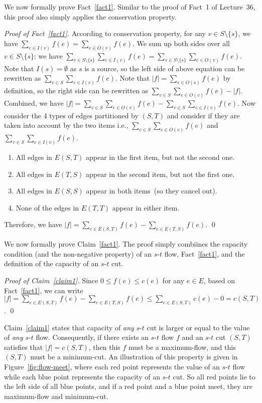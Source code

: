 We now formally prove Fact~\ref{fact1}. 
Similar to the proof of Fact~1 of Lecture~36, this proof also simply applies the conservation property.

\emph{Proof of Fact~\ref{fact1}.} According to conservation property, for any $v\in S\setminus \{s\}$,
we have $\sum_{e\in I(v)} f(e) = \sum_{e\in O(v)} f(e)$. 
We sum up both sides over all $v\in S\setminus\{s\}$: 
we have $\sum_{v\in S\setminus\{s\}} \sum_{e\in I(v)} f(e) = \sum_{v\in S\setminus\{s\}} \sum_{e\in O(v)} f(e)$. 
Note that $I(s) = \emptyset$ as $s$ is a source, so the left side of above equation can be rewritten as $\sum_{v\in S} \sum_{e\in I(v)} f(e)$.
Note that $|f| = \sum_{e\in O(s)} f(e)$ by definition, so the right side can be rewritten as $\sum_{v\in S} \sum_{e\in O(v)} f(e) - |f|$.
Combined, we have $|f| = \sum_{v\in S} \sum_{e\in O(v)} f(e) - \sum_{v\in S} \sum_{e\in I(v)} f(e)$. 
Now consider the 4 types of edges partitioned by $(S, T)$ and consider if they are taken into account by the two items
i.e., $\sum_{v\in S} \sum_{e\in O(v)} f(e)$ and $\sum_{v\in S} \sum_{e\in I(v)} f(e)$. 
\vspace*{-\topsep}
\begin{enumerate}
\item All edges in $E(S, T)$ appear in the first item, but not the second one.
\item All edges in $E(T, S)$ appear in the second item, but not the first one.
\item All edges in $E(S, S)$ appear in both items~(so they cancel out).
\item None of the edges in $E(T, T)$ appear in either item.
\end{enumerate}
Therefore, we have $|f| = \sum_{e\in E(S, T)} f(e) - \sum_{e\in E(T, S)} f(e)$. \qed

We now formally prove Claim~\ref{fact1}. The proof simply combiines the capacity condition (and the non-negative property) of an $s$-$t$ flow,
Fact~\ref{fact1}, and the definition of the capacity of an $s$-$t$ cut.

\emph{Proof of Claim~\ref{claim1}.} Since $0\le f(e) \le c(e)$ for any $e\in E$,
based on Fact~\ref{fact1}, we can write
$|f| = \sum_{e\in E(S, T)} f(e) - \sum_{e\in E(T, S)} f(e)
\le \sum_{e\in E(S, T)} c(e) - 0 = c(S, T)$. \qed

Claim~\ref{claim1} states that capacity of \emph{any} $s$-$t$ cut
is larger or equal to the value of \emph{any} $s$-$t$ flow.
Consequently, if there exists an $s$-$t$ flow $f$ and an $s$-$t$ cut $(S,T)$
satisfies that $|f| = c(S, T)$, then this $f$ must be a maximum-flow,
and this $(S, T)$ must be a minimum-cut.
An illustration of this property is given in Figure~\ref{fig:flow-meet},
where each red point represents the value of an $s$-$t$ flow
while each blue point represents the capacity of an $s$-$t$ cut.
So all red points lie to the left side of all blue points,
and if a red point and a blue point meet, they are maximum-flow and minimum-cut.

